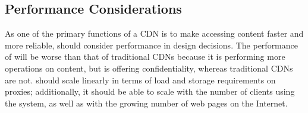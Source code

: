 \subsection{Performance Considerations}
As one of the primary functions of a CDN is to make accessing content faster and more 
reliable, \system{} should consider performance in design decisions.  The performance of \system{} will 
be worse than that of traditional CDNs because it is performing more operations on content, but \system{} 
is offering confidentiality, whereas traditional CDNs are not.  \system{} should scale linearly in terms of load 
and storage requirements on proxies; additionally, it should be able to 
scale with the number of clients using the system, as well as with the growing number of web pages on the Internet.






